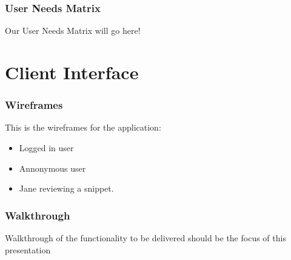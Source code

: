 \documentclass{beamer}
\begin{document}
\begin{frame}
\frametitle{User Needs Matrix}
Our User Needs Matrix will go here!
\end{frame}

\section{Client Interface}

\begin{frame}
\frametitle{Wireframes}
This is the wireframes for the application:
\begin{itemize}
\item Logged in user
\item Annonymous user
\item Jane reviewing a snippet.
\end{itemize}
\end{frame}

\begin{frame}
\frametitle{Walkthrough}
Walkthrough of the functionality to be delivered should be the focus of
this presentation
\end{frame}
\end{document}
